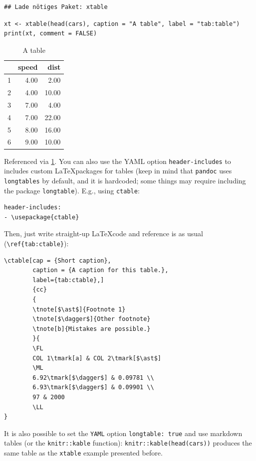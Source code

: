 \documentclass[Royal,times,sageh]{sagej}
\begin{document}
\begin{verbatim}
## Lade nötiges Paket: xtable
\end{verbatim}

\begin{verbatim}
xt <- xtable(head(cars), caption = "A table", label = "tab:table")
print(xt, comment = FALSE)
\end{verbatim}

\begin{table}[ht]
\centering
\begin{tabular}{rrr}
  \hline
 & speed & dist \\ 
  \hline
1 & 4.00 & 2.00 \\ 
  2 & 4.00 & 10.00 \\ 
  3 & 7.00 & 4.00 \\ 
  4 & 7.00 & 22.00 \\ 
  5 & 8.00 & 16.00 \\ 
  6 & 9.00 & 10.00 \\ 
   \hline
\end{tabular}
\caption{A table} 
\label{tab:table}
\end{table}

Referenced via \ref{tab:table}. You can also use the YAML option
\texttt{header-includes} to includes custom \LaTeX packages for tables
(keep in mind that \texttt{pandoc} uses \texttt{longtables} by default,
and it is hardcoded; some things may require including the package
\texttt{longtable}). E.g., using \texttt{ctable}:

\begin{verbatim}
header-includes:
- \usepackage{ctable}
\end{verbatim}

Then, just write straight-up \LaTeX code and reference is as usual
(\texttt{\textbackslash{}ref\{tab:ctable\}}):

\begin{verbatim}
\ctable[cap = {Short caption},
        caption = {A caption for this table.},
        label={tab:ctable},]
        {cc}
        {
        \tnote[$\ast$]{Footnote 1}
        \tnote[$\dagger$]{Other footnote}
        \tnote[b]{Mistakes are possible.}
        }{
        \FL
        COL 1\tmark[a] & COL 2\tmark[$\ast$]
        \ML
        6.92\tmark[$\dagger$] & 0.09781 \\
        6.93\tmark[$\dagger$] & 0.09901 \\
        97 & 2000
        \LL
}
\end{verbatim}

It is also possible to set the \texttt{YAML} option
\texttt{longtable:\ true} and use markdown tables (or the
\texttt{knitr::kable} function): \texttt{knitr::kable(head(cars))}
produces the same table as the \texttt{xtable} example presented before.
\end{document}
